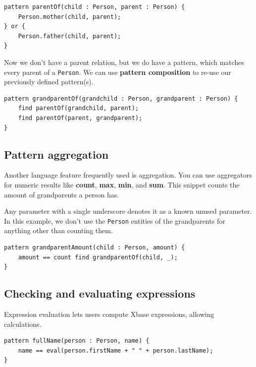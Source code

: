 \documentclass[11pt,a4paper,oneside]{report}
\begin{document}
\begin{lstlisting}[caption={Parent-child relation, using pattern dijunction}, frame=single]
pattern parentOf(child : Person, parent : Person) {
    Person.mother(child, parent);
} or {
    Person.father(child, parent);
}
\end{lstlisting}

Now we don't have a parent relation, but we do have a pattern, which matches
every parent of a \texttt{Person}. We can use \textbf{pattern composition} to
re-use our previously defined pattern(s).

\begin{lstlisting}[caption={Grandparent-grandchild relation, using pattern composition}, frame=single]
pattern grandparentOf(grandchild : Person, grandparent : Person) {
    find parentOf(grandchild, parent);
    find parentOf(parent, grandparent);
}
\end{lstlisting}

\subsection{Pattern aggregation}
Another language feature frequently used is aggregation. You can use
aggregators for numeric results like \textbf{count}, \textbf{max}, \textbf{min},
and \textbf{sum}. This snippet counts the amount of grandparents a person has.

Any parameter with a single underscore denotes it as a known unused parameter.
In this example, we don't use the \texttt{Person} entities of the grandparents
for anything other than counting them.

\begin{lstlisting}[caption={Counting grandparents using pattern aggregation}, frame=single]
pattern grandparentAmount(child : Person, amount) {
    amount == count find grandparentOf(child, _);
}
\end{lstlisting}

\subsection{Checking and evaluating expressions}
Expression evaluation lets users compute Xbase expressions, allowing calculations.

\begin{lstlisting}[caption={Calculating a \texttt{Person}'s full name using expression evaluation}, frame=single]
pattern fullName(person : Person, name) {
    name == eval(person.firstName + " " + person.lastName);
}
\end{lstlisting}
\end{document}
